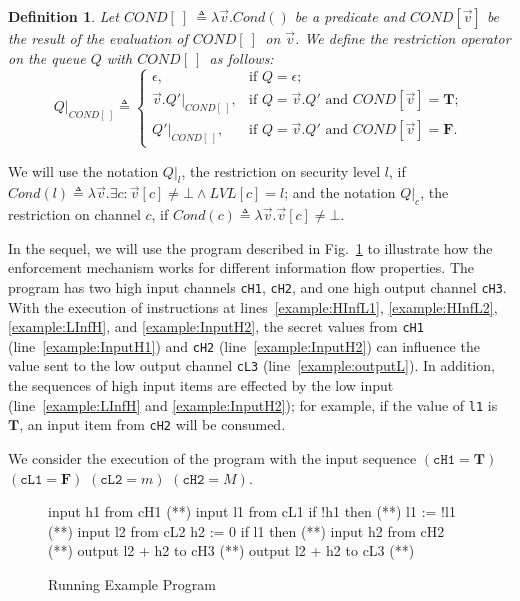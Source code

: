 \documentclass[10pt,a4paper,oneside]{article}
\newtheorem{definition}{Definition}[section]
\def\restrict#1#2{\ensuremath{{#1}|_{#2}}}
\def\LVL{\ensuremath{LVL}}
\def\VTRUE{\ensuremath{\textbf{T}}}
\def\VFALSE{\ensuremath{\textbf{F}}}
\def\chnl{\ensuremath{c}}
\def\NIL{\ensuremath{\bot}}
\def\emptyQ{\ensuremath{\epsilon}}
\def\qItem#1#2{\ensuremath{(\linecode{#1}=#2)}}
\def\COND{\ensuremath{COND[\ ]}}
\def\CONDP#1{\ensuremath{COND[#1]}}
\def\linecode#1{{\texttt{#1}}}
\begin{document}
\begin{definition}
Let $\COND\ \triangleq \lambda \vec{v}. Cond()$ be a predicate and \CONDP{\vec{v}} be the result of the evaluation of \COND\ on $\vec{v}$. We define the restriction operator on the queue $Q$ with \COND\ as follows:
\begin{equation*}
\restrict{Q}{\COND} \triangleq \begin{cases}
	\emptyQ, &\text{if $Q = \emptyQ$};\\
	\vec{v}.\restrict{Q'}{\COND}, &\text{if $Q = \vec{v}.Q'$ and $\CONDP{\vec{v}} = \VTRUE$}; \\
	\restrict{Q'}{\COND}, &\text{if $Q = \vec{v}.Q'$ and $\CONDP{\vec{v}} = \VFALSE$}.
	\end{cases}
\end{equation*}
\end{definition}

We will use the notation \restrict{Q}{l}, the restriction on security level $l$, if $Cond(l) \triangleq \lambda \vec{v}. \exists \chnl:\vec{v}[\chnl] \neq \NIL \wedge \LVL[\chnl] = l$; and the notation \restrict{Q}{\chnl}, the restriction on channel \chnl, if $Cond(c) \triangleq \lambda \vec{v}. \vec{v}[\chnl] \neq \NIL$.




In the sequel, we will use the program described in Fig.~\ref{fig:example:source} to illustrate how the enforcement mechanism works for different information flow properties. The program has two high input channels \linecode{cH1}, \linecode{cH2}, and one high output channel \linecode{cH3}. With the execution of instructions at lines~\ref{example:HInfL1}, \ref{example:HInfL2}, \ref{example:LInfH}, and \ref{example:InputH2}, the secret values from \linecode{cH1} (line~\ref{example:InputH1}) and \linecode{cH2} (line~\ref{example:InputH2}) can influence the value sent to the low output channel \linecode{cL3} (line~\ref{example:outputL}). In addition, the sequences of high input items are effected by the low input (line~\ref{example:LInfH} and \ref{example:InputH2}); for example, if the value of \linecode{l1} is \VTRUE, an input item from \linecode{cH2} will be consumed.

We consider the execution of the program with the input sequence \qItem{cH1}{\VTRUE} \qItem{cL1}{\VFALSE} \qItem{cL2}{m} \qItem{cH2}{M}. 


\begin{figure}[!t]
\begin{javascript}
input h1 from cH1          (*\label{example:InputH1}*)
input l1 from cL1
if !h1 then                (*\label{example:HInfL1}*)
    l1 := !l1              (*\label{example:HInfL2}*)
input l2 from cL2
h2 := 0
if l1 then	               (*\label{example:LInfH}*)
    input h2 from cH2      (*\label{example:InputH2}*)
output l2 + h2 to cH3      (*\label{example:outputH}*)
output l2 + h2 to cL3	   (*\label{example:outputL}*)
\end{javascript}
\caption{Running Example Program}
\label{fig:example:source}
\end{figure}
\end{document}
